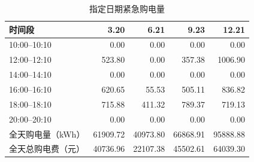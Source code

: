 \begin{table}[!htbp]
  \centering


  \begin{minipage}[t]{0.55\textwidth}
    \vspace{0pt}
    \centering
    \caption{指定日期调整后购电量与全天购电费用}
    \label{tab:q3_t1}
    \footnotesize
    \setlength{\tabcolsep}{4.5pt}

    \begin{tabular}{lrrrr}
      \toprule

      \rowcolor{headerblue}
      时间段 & 3.20 & 6.21 & 9.23 & 12.21 \\

      \midrule

      10:00--10:10 & 0.00 & 0.00 & 0.00 & 0.00 \\

      \rowcolor{rowblue}
      12:00--12:10 & 523.80 & 0.00 & 357.38 & 1006.90 \\

      14:00--14:10 & 0.00 & 0.00 & 0.00 & 0.00 \\

      \rowcolor{rowblue}
      16:00--16:10 & 620.65 & 55.53 & 505.11 & 836.82 \\

      18:00--18:10 & 715.88 & 411.32 & 789.37 & 719.13 \\

      \rowcolor{rowblue}
      20:00--20:10 & 0.00 & 0.00 & 0.00 & 0.00 \\

      \midrule

      全天购电量（kWh） & 61909.72 & 40973.80 & 66868.91 & 95888.88 \\

      \rowcolor{rowblue}
      全天总购电费（元） & 40736.96 & 22107.38 & 45502.61 & 64039.30 \\

      \bottomrule
    \end{tabular}
  \end{minipage}%
  \hspace{0.10\textwidth}%
  \begin{minipage}[t]{0.36\textwidth}
    \vspace{0pt}
    \centering
    \caption{指定日期紧急购电量}
    \label{tab:q3_t3}
    \footnotesize
    \setlength{\tabcolsep}{4.5pt}


\end{minipage}
\end{table}
